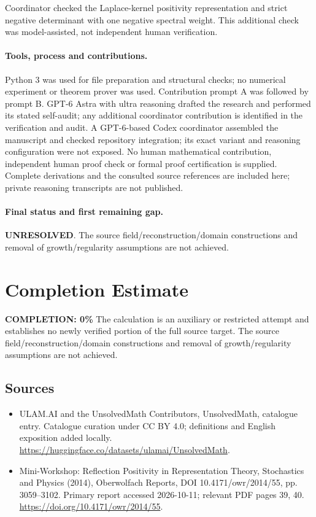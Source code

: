 \documentclass[11pt]{article}
\begin{document}
Coordinator checked the Laplace-kernel positivity representation and strict negative determinant with one negative spectral weight. This additional check was model-assisted, not independent human verification.

\paragraph{Tools, process and contributions.}
Python 3 was used for file preparation and structural checks; no numerical experiment or theorem prover was used. Contribution prompt A was followed by prompt B. GPT-6 Astra with ultra reasoning drafted the research and performed its stated self-audit; any additional coordinator contribution is identified in the verification and audit. A GPT-6-based Codex coordinator assembled the manuscript and checked repository integration; its exact variant and reasoning configuration were not exposed. No human mathematical contribution, independent human proof check or formal proof certification is supplied. Complete derivations and the consulted source references are included here; private reasoning transcripts are not published.

\paragraph{Final status and first remaining gap.}
\textbf{UNRESOLVED}. The source field/reconstruction/domain constructions and removal of growth/regularity assumptions are not achieved.

\section{Completion Estimate}
\noindent\textbf{COMPLETION: 0\%}
The calculation is an auxiliary or restricted attempt and establishes no newly verified portion of the full source target. The source field/reconstruction/domain constructions and removal of growth/regularity assumptions are not achieved.

\subsection{Sources}
\begin{itemize}
\item[\hypertarget{source:statement:1}{S1}] ULAM.AI and the UnsolvedMath Contributors, UnsolvedMath, catalogue entry. Catalogue curation under CC BY 4.0; definitions and English exposition added locally.
\url{https://huggingface.co/datasets/ulamai/UnsolvedMath}.
\item[\hypertarget{source:statement:2}{S2}] Mini-Workshop: Reflection Positivity in Representation Theory, Stochastics and Physics (2014), Oberwolfach Reports, DOI 10.4171/owr/2014/55, pp. 3059--3102. Primary report accessed 2026-10-11; relevant PDF pages 39, 40.
\url{https://doi.org/10.4171/owr/2014/55}.
\end{itemize}
\label{end:statement}
\end{document}
